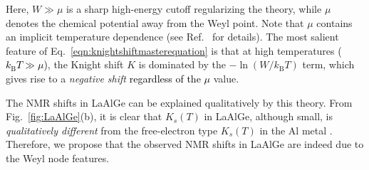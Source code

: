 \documentclass[aps,prb,a4paper,10pt,twocolumn,showpacs,floatfix,superscriptaddress,preprintnumbers,longbibliography]{revtex4-2}
\newcommand{\tcr}[1]{\textcolor{black}{#1}}
\begin{document}
%
%
Here, $W\gg\mu$ is a sharp high-energy cutoff 
regularizing the theory, while $\mu$ denotes the chemical potential away 
from the Weyl point. Note that $\mu$ contains an implicit 
temperature dependence (see Ref.~\cite{Okvtovity2019nuclear} for details). 
The most salient feature of Eq.~\eqref{eqn:knightshiftmasterequation} is 
that at high temperatures \tcr{($k_\mathrm{B}T\gg\mu$)}, the Knight shift $K$ is dominated 
by the $-\ln(W/k_\mathrm{B}T)$ term, which gives rise to 
a \emph{negative shift} \tcr{regardless of the $\mu$} value. 

%
%


The NMR shifts in LaAlGe can be explained qualitatively by this theory. 
From Fig.~\ref{fig:LaAlGe}(b), %
it is clear that $K_s(T)$ in LaAlGe,
although small, is \emph{qualitatively different} from the
free-electron type $K_s(T)$ in the Al metal \cite{bennett1970relevance}.
Therefore, we propose that the observed NMR shifts in LaAlGe are indeed
due to the Weyl node features.  
\end{document}
